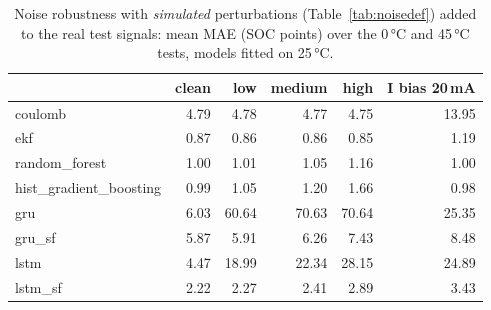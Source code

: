 \begin{table}[htbp]\centering\footnotesize
\begin{tabular}{lrrrrr}
\toprule
 & clean & low & medium & high & I bias 20\,mA \\
\midrule
coulomb & 4.79 & 4.78 & 4.77 & 4.75 & 13.95 \\
ekf & 0.87 & 0.86 & 0.86 & 0.85 & 1.19 \\
random\_forest & 1.00 & 1.01 & 1.05 & 1.16 & 1.00 \\
hist\_gradient\_boosting & 0.99 & 1.05 & 1.20 & 1.66 & 0.98 \\
gru & 6.03 & 60.64 & 70.63 & 70.64 & 25.35 \\
gru\_sf & 5.87 & 5.91 & 6.26 & 7.43 & 8.48 \\
lstm & 4.47 & 18.99 & 22.34 & 28.15 & 24.89 \\
lstm\_sf & 2.22 & 2.27 & 2.41 & 2.89 & 3.43 \\
\bottomrule
\end{tabular}
\caption{Noise robustness with \emph{simulated} perturbations (Table~\ref{tab:noisedef}) added to the real test signals: mean MAE (SOC points) over the 0\,°C and 45\,°C tests, models fitted on 25\,°C.}\label{tab:noise}
\end{table}
